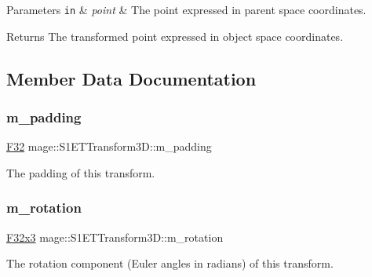 \begin{DoxyParams}[1]{Parameters}
\mbox{\tt in}  & {\em point} & The point expressed in parent space coordinates. \\
\hline
\end{DoxyParams}
\begin{DoxyReturn}{Returns}
The transformed point expressed in object space coordinates. 
\end{DoxyReturn}


\subsection{Member Data Documentation}
\mbox{\label{classmage_1_1_s1_e_t_transform3_d_aef080656b9e91c5e143fd4b9e5a61cfe}} 
\subsubsection{\texorpdfstring{m\+\_\+padding}{m\_padding}}
{\footnotesize\ttfamily \mbox{\hyperlink{namespacemage_aa97e833b45f06d60a0a9c4fc22ae02c0}{F32}} mage\+::\+S1\+E\+T\+Transform3\+D\+::m\+\_\+padding\hspace{0.3cm}{\ttfamily [private]}}

The padding of this transform. \mbox{\label{classmage_1_1_s1_e_t_transform3_d_ae64da86a555645533a01748dc99459da}} 
\subsubsection{\texorpdfstring{m\+\_\+rotation}{m\_rotation}}
{\footnotesize\ttfamily \mbox{\hyperlink{namespacemage_a1e3c7a882af461f161caa1cbddaf1fa2}{F32x3}} mage\+::\+S1\+E\+T\+Transform3\+D\+::m\+\_\+rotation\hspace{0.3cm}{\ttfamily [private]}}

The rotation component (Euler angles in radians) of this transform. \mbox{\label{classmage_1_1_s1_e_t_transform3_d_ab5e794d18aa0c35b0999014ee7e086e4}} 
